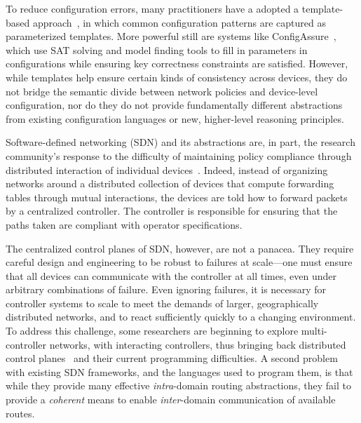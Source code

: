 To reduce configuration errors, many practitioners have a adopted a template-based
approach~\cite{hatch,thwack}, in which common configuration patterns are captured as parameterized templates.  More powerful still are systems like
ConfigAssure~\cite{narain:lisa05,narain+:configassure}, which use SAT solving
and model finding tools to fill in parameters in configurations while
ensuring key correctness constraints are satisfied.  However,
 while templates help ensure certain kinds of consistency across devices, 
they do not bridge the
semantic divide between network policies and device-level configuration,
nor do they do not provide fundamentally different abstractions
from existing configuration languages or new, higher-level reasoning 
principles.

Software-defined networking (SDN) and its abstractions 
are, in part, the research
community's response to the difficulty of maintaining policy
compliance through distributed interaction of individual
devices~\cite{sdn-languages}. Indeed, instead of organizing networks
around a distributed collection of devices that compute forwarding tables through
mutual interactions, the devices are told how to
forward packets by a centralized controller. The controller is responsible for ensuring that the
paths taken are compliant with operator specifications.

The centralized control planes of SDN, however, are not a panacea.
%
They require careful design and engineering to be robust to failures at scale---one must ensure that all devices can communicate with the controller at all times, even under arbitrary combinations of failure. Even ignoring failures, it is necessary for controller systems to
scale to meet the demands of larger, geographically distributed networks, 
and to react sufficiently quickly
to a changing environment. To address this challenge, some researchers are beginning to 
explore
multi-controller networks, with interacting controllers, thus bringing back distributed
control planes~\cite{mccauley2013extending,onos} and their current programming difficulties.  
A second problem with existing SDN frameworks, and the languages used to
program them, is that while they provide many 
effective \emph{intra}-domain routing
abstractions, they fail to provide a \emph{coherent} means to enable 
\emph{inter}-domain communication of available routes.

